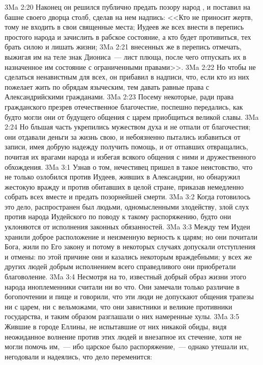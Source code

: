 \vs 3Ma 2:20 Наконец он решился публично предать позору народ , и поставил на башне своего дворца столб, сделав на нем надпись: <<Кто не приносит жертв, тому не входить в свои священные места; Иудеев же всех внести в перепись простого народа и зачислить в рабское состояние, а кто будет противиться, тех брать силою и лишать жизни;
\vs 3Ma 2:21 внесенных же в перепись отмечать, выжигая им на теле знак Диониса~--- лист плюща, после чего отпускать их в назначенное им состояние с ограниченными правами>>.
\vs 3Ma 2:22 Но чтобы не сделаться ненавистным для всех, он прибавил в надписи, что, если кто из них пожелает жить по обрядам языческим, тем давать равные права с Александрийскими гражданами.
\vs 3Ma 2:23 Посему некоторые, ради права гражданского презрев отечественное благочестие, поспешно передались, как будто могли они от будущего общения с царем приобщиться великой славы.
\vs 3Ma 2:24 Но бльшая часть укрепились мужеством духа и не отпали от благочестия; они отдавали деньги за жизнь свою, и небоязненно пытались избавиться от записи, имея добрую надежду получить помощь, и от отпавших отвращались, почитая их врагами  народа и избегая всякого общения с ними и дружественного обхождения.
\vs 3Ma 3:1 Узнав о том, нечестивец пришел в такое неистовство, что не только озлобился против Иудеев, живших в Александрии, но обнаружил жестокую вражду и против обитавших в целой стране, приказав немедленно собрать всех вместе и предать позорнейшей смерти.
\vs 3Ma 3:2 Когда готовилось это дело, распространен был людьми, одномысленными злодейству, злой слух против народа Иудейского по поводу к такому распоряжению, будто они уклоняются от исполнения законных обязанностей.
\vs 3Ma 3:3 Между тем Иудеи хранили доброе расположение и неизменную верность к царям; но они почитали Бога, жили по Его закону и потому в некоторых случаях допускали отступления и отмены: по этой причине они и казались некоторым враждебными; у всех же других людей добрым исполнением всего справедливого они приобретали благоволение.
\vs 3Ma 3:4 Несмотря на то, известный добрый образ жизни этого народа иноплеменники считали ни во что. Они замечали только различие в богопочтении и пище и говорили, что эти люди не допускают общения трапезы ни с царем, ни с вельможами, что они завистники и великие противники государства, и таким образом разглашали о них намеренные хулы.
\vs 3Ma 3:5 Жившие в городе Еллины, не испытавшие от них никакой обиды, видя неожиданное волнение против этих людей и внезапное их стечение, хотя не могли помочь им,~--- ибо царское было распоряжение,~--- однако утешали их, негодовали и надеялись, что дело переменится:
